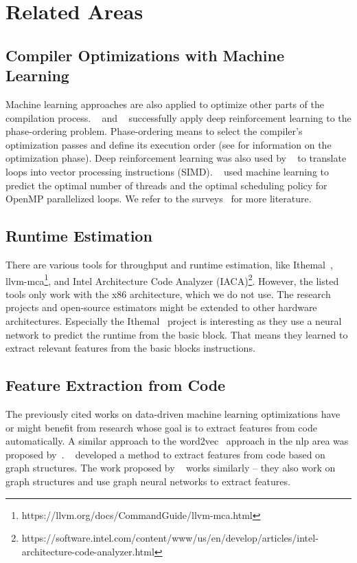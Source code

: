 \section{Related Areas}
\label{sec:rw:other}
\subsection{Compiler Optimizations with Machine Learning}
Machine learning approaches are also applied to optimize other parts of the compilation process.
\citeauthor{mammadli2020static}~\cite{mammadli2020static} and \citeauthor{huang2019autophase}~\cite{huang2019autophase} successfully apply deep reinforcement learning to the phase-ordering problem.
Phase-ordering means to select the compiler's optimization passes and define its execution order (see  for information on the optimization phase).
Deep reinforcement learning was also used by \citeauthor{haj2020neurovectorizer}~\cite{haj2020neurovectorizer} to translate loops into vector processing instructions (SIMD).
\citeauthor{wang2009mapping}~\cite{wang2009mapping} used machine learning to predict the optimal number of threads and the optimal scheduling policy for OpenMP parallelized loops.
We refer to the surveys~\cite{wang2018machine,ashouri2018survey} for more literature.

\subsection{Runtime Estimation}
\label{sec:rw:other:runtime}
There are various tools for throughput and runtime estimation, like Ithemal~\cite{mendis2019ithemal}, llvm-mca\footnote{https://llvm.org/docs/CommandGuide/llvm-mca.html}, and Intel Architecture Code Analyzer (IACA)\footnote{https://software.intel.com/content/www/us/en/develop/articles/intel-architecture-code-analyzer.html}.
However, the listed tools only work with the x86 architecture, which we do not use.
The research projects and open-source estimators might be extended to other hardware architectures.
Especially the Ithemal~\cite{mendis2019ithemal} project is interesting as they use a neural network to predict the runtime from the basic block.
That means they learned to extract relevant features from the basic blocks instructions.

\subsection{Feature Extraction from Code}
The previously cited works on data-driven machine learning optimizations have or might benefit from research whose goal is to extract features from code automatically.
A similar approach to the word2vec~\cite{mikolov2013efficient} approach in the \ac{nlp} area was proposed by~\cite{ben2018neural,alon2019code2vec}.
\citeauthor{cummins2021programl}~\cite{cummins2021programl} developed a method to extract features from code based on graph structures.
The work proposed by \citeauthor{brauckmann2020compiler}~\cite{brauckmann2020compiler} works similarly -- they also work on graph structures and use graph neural networks to extract features.

